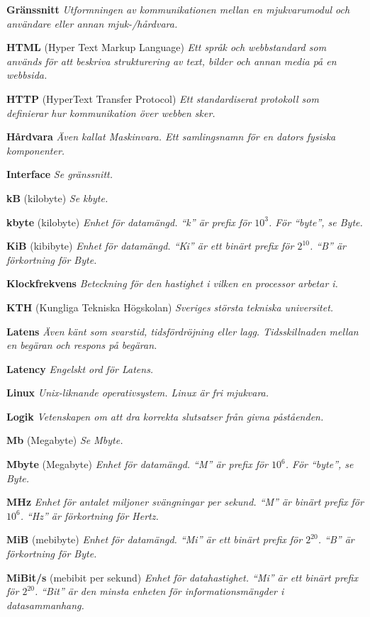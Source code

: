 \documentclass[a4paper, twoside, 11pt, titlepage]{article}
\begin{document}
	\textbf{Gränssnitt} \emph{Utformningen av kommunikationen mellan en mjukvarumodul och användare eller annan mjuk-/hårdvara.}

	\textbf{HTML} (Hyper Text Markup Language) \emph{Ett språk och webbstandard som används för att beskriva strukturering av text, bilder och annan media på en webbsida.}

	\textbf{HTTP} (HyperText Transfer Protocol) \emph{Ett standardiserat protokoll som definierar hur kommunikation över webben sker.}

	\textbf{Hårdvara} \emph{Även kallat Maskinvara. Ett samlingsnamn för en dators fysiska komponenter.}

	\textbf{Interface} \emph{Se gränssnitt.}

	\textbf{kB} (kilobyte) \emph{Se kbyte.}

	\textbf{kbyte} (kilobyte) \emph{Enhet för datamängd. ``k'' är prefix för $10^3$. För ``byte'', se Byte.}

	\textbf{KiB} (kibibyte) \emph{Enhet för datamängd. ``Ki'' är ett binärt prefix för $2^10$. ``B'' är förkortning för Byte.}

	\textbf{Klockfrekvens} \emph{Beteckning för den hastighet i vilken en processor arbetar i.}

	\textbf{KTH} (Kungliga Tekniska Högskolan) \emph{Sveriges största tekniska universitet.}

	\textbf{Latens} \emph{Även känt som svarstid, tidsfördröjning eller lagg. Tidsskillnaden mellan en begäran och respons på begäran.}

	\textbf{Latency} \emph{Engelskt ord för Latens.}

	\textbf{Linux} \emph{Unix-liknande operativsystem. Linux är fri mjukvara.}

	\textbf{Logik} \emph{Vetenskapen om att dra korrekta slutsatser från givna påståenden.}

	\textbf{Mb} (Megabyte) \emph{Se Mbyte.}

	\textbf{Mbyte} (Megabyte) \emph{Enhet för datamängd. ``M'' är prefix för $10^6$.  För ``byte'', se Byte.}

	\textbf{MHz} \emph{Enhet för antalet miljoner svängningar per sekund. ``M'' är binärt prefix för $10^6$. ``Hz'' är förkortning för Hertz.}

	\textbf{MiB} (mebibyte) \emph{Enhet för datamängd. ``Mi'' är ett binärt prefix för $2^20$. ``B'' är förkortning för Byte.}

	\textbf{MiBit/s} (mebibit per sekund) \emph{Enhet för datahastighet. ``Mi'' är ett binärt prefix för $2^20$. ``Bit'' är den minsta enheten för informationsmängder i datasammanhang.}
\end{document}
